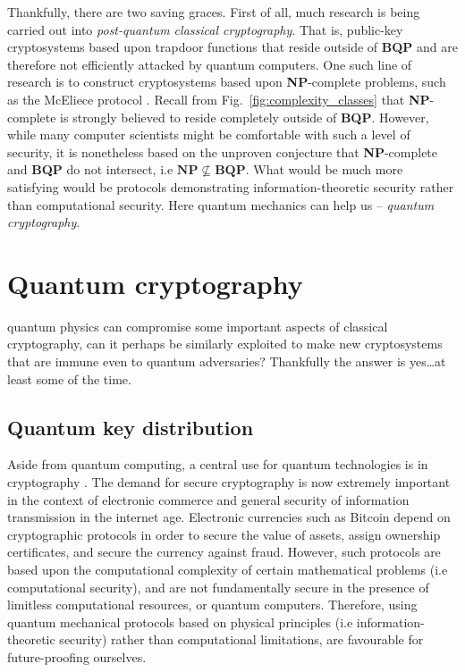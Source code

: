 Thankfully, there are two saving graces. First of all, much research is being carried out into \textit{post-quantum classical cryptography}. That is, public-key cryptosystems based upon trapdoor functions that reside outside of \textbf{BQP} and are therefore not efficiently attacked by quantum computers. One such line of research is to construct cryptosystems based upon \textbf{NP}-complete problems, such as the McEliece protocol \cite{bib:McEliece}. Recall from Fig.~\ref{fig:complexity_classes} that \textbf{NP}-complete is strongly believed to reside completely outside of \textbf{BQP}. However, while many computer scientists might be comfortable with such a level of security, it is nonetheless based on the unproven conjecture that \textbf{NP}-complete and \textbf{BQP} do not intersect, i.e \mbox{$\mathbf{NP}\nsubseteq\mathbf{BQP}$}. What would be much more satisfying would be protocols demonstrating information-theoretic security rather than computational security. Here quantum mechanics can help us -- \textit{quantum cryptography}.

%
%

\section{Quantum cryptography}

 quantum physics can compromise some important aspects of classical cryptography, can it perhaps be similarly exploited to make new cryptosystems that are immune even to quantum adversaries? Thankfully the answer is yes\ldots at least some of the time.

%
%

\subsection{Quantum key distribution} \label{sec:QKD} 

Aside from quantum computing, a central use for quantum technologies is in cryptography \cite{bib:Gisin02}. The demand for secure cryptography is now extremely important in the context of electronic commerce and general security of information transmission in the internet age. Electronic currencies such as Bitcoin depend on cryptographic protocols in order to secure the value of assets, assign ownership certificates, and secure the currency against fraud. However, such protocols are based upon the computational complexity of certain mathematical problems (i.e computational security), and are not fundamentally secure in the presence of limitless computational resources, or quantum computers. Therefore, using quantum mechanical protocols based on physical principles (i.e information-theoretic security) rather than computational limitations, are favourable for future-proofing ourselves.

